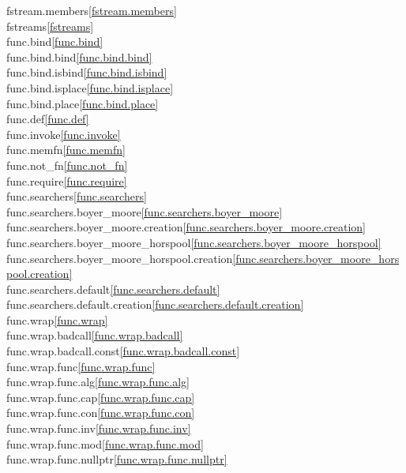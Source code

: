 \begin{multicols}{2}
fstream.members\quad\ref{fstream.members}\\
fstreams\quad\ref{fstreams}\\
func.bind\quad\ref{func.bind}\\
func.bind.bind\quad\ref{func.bind.bind}\\
func.bind.isbind\quad\ref{func.bind.isbind}\\
func.bind.isplace\quad\ref{func.bind.isplace}\\
func.bind.place\quad\ref{func.bind.place}\\
func.def\quad\ref{func.def}\\
func.invoke\quad\ref{func.invoke}\\
func.memfn\quad\ref{func.memfn}\\
func.not_fn\quad\ref{func.not_fn}\\
func.require\quad\ref{func.require}\\
func.searchers\quad\ref{func.searchers}\\
func.searchers.boyer_moore\quad\ref{func.searchers.boyer_moore}\\
func.searchers.boyer_moore.creation\quad\ref{func.searchers.boyer_moore.creation}\\
func.searchers.boyer_moore_horspool\quad\ref{func.searchers.boyer_moore_horspool}\\
func.searchers.boyer_moore_horspool.creation\quad\ref{func.searchers.boyer_moore_horspool.creation}\\
func.searchers.default\quad\ref{func.searchers.default}\\
func.searchers.default.creation\quad\ref{func.searchers.default.creation}\\
func.wrap\quad\ref{func.wrap}\\
func.wrap.badcall\quad\ref{func.wrap.badcall}\\
func.wrap.badcall.const\quad\ref{func.wrap.badcall.const}\\
func.wrap.func\quad\ref{func.wrap.func}\\
func.wrap.func.alg\quad\ref{func.wrap.func.alg}\\
func.wrap.func.cap\quad\ref{func.wrap.func.cap}\\
func.wrap.func.con\quad\ref{func.wrap.func.con}\\
func.wrap.func.inv\quad\ref{func.wrap.func.inv}\\
func.wrap.func.mod\quad\ref{func.wrap.func.mod}\\
func.wrap.func.nullptr\quad\ref{func.wrap.func.nullptr}\\

\end{multicols}
